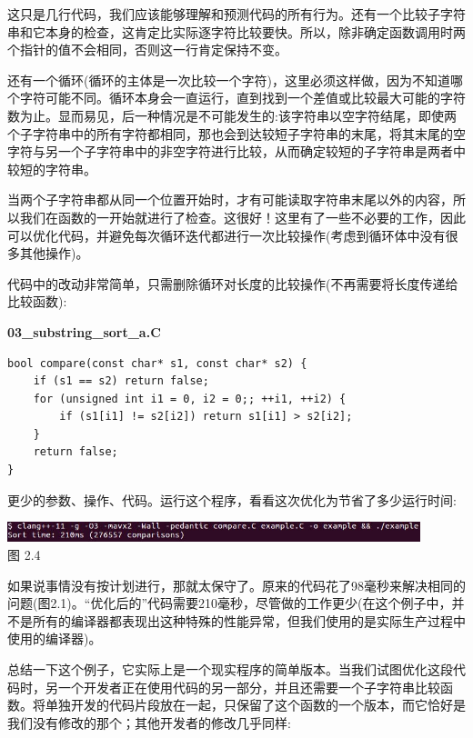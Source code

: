 这只是几行代码，我们应该能够理解和预测代码的所有行为。还有一个比较子字符串和它本身的检查，这肯定比实际逐字符比较要快。所以，除非确定函数调用时两个指针的值不会相同，否则这一行肯定保持不变。

还有一个循环(循环的主体是一次比较一个字符)，这里必须这样做，因为不知道哪个字符可能不同。循环本身会一直运行，直到找到一个差值或比较最大可能的字符数为止。显而易见，后一种情况是不可能发生的:该字符串以空字符结尾，即使两个子字符串中的所有字符都相同，那也会到达较短子字符串的末尾，将其末尾的空字符与另一个子字符串中的非空字符进行比较，从而确定较短的子字符串是两者中较短的字符串。

当两个子字符串都从同一个位置开始时，才有可能读取字符串末尾以外的内容，所以我们在函数的一开始就进行了检查。这很好！这里有了一些不必要的工作，因此可以优化代码，并避免每次循环迭代都进行一次比较操作(考虑到循环体中没有很多其他操作)。

代码中的改动非常简单，只需删除循环对长度的比较操作(不再需要将长度传递给比较函数):

\noindent
\textbf{03\_substring\_sort\_a.C}
\begin{lstlisting}[style=styleCXX]
bool compare(const char* s1, const char* s2) {
	if (s1 == s2) return false;
	for (unsigned int i1 = 0, i2 = 0;; ++i1, ++i2) {
		if (s1[i1] != s2[i2]) return s1[i1] > s2[i2];
	}
	return false;
}
\end{lstlisting}

更少的参数、操作、代码。运行这个程序，看看这次优化为节省了多少运行时间:

\begin{center}
\includegraphics[width=0.9\textwidth]{content/1/chapter2/images/4.jpg}\\
图 2.4
\end{center}

如果说事情没有按计划进行，那就太保守了。原来的代码花了98毫秒来解决相同的问题(图2.1)。“优化后的”代码需要210毫秒，尽管做的工作更少(在这个例子中，并不是所有的编译器都表现出这种特殊的性能异常，但我们使用的是实际生产过程中使用的编译器)。

总结一下这个例子，它实际上是一个现实程序的简单版本。当我们试图优化这段代码时，另一个开发者正在使用代码的另一部分，并且还需要一个子字符串比较函数。将单独开发的代码片段放在一起，只保留了这个函数的一个版本，而它恰好是我们没有修改的那个；其他开发者的修改几乎同样:

